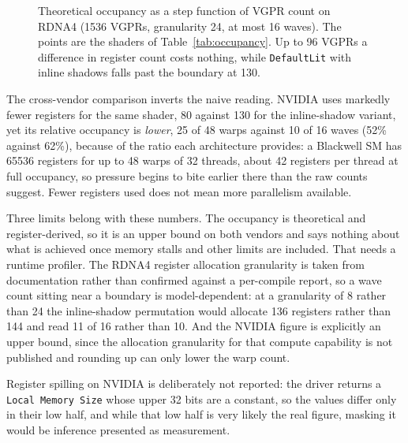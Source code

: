 \begin{figure}[tbp]
\centering
{}
\caption[Occupancy as a step function of VGPR count]{Theoretical occupancy as a step function of VGPR
count on RDNA4 (1536 VGPRs, granularity 24, at most 16 waves). The points are the shaders of
Table~\ref{tab:occupancy}. Up to 96 VGPRs a difference in register count costs nothing, while
\texttt{DefaultLit} with inline shadows falls past the boundary at 130.}
\label{fig:occupancy-cliff}
\end{figure}

The cross-vendor comparison inverts the naive reading. NVIDIA uses markedly fewer registers for the
same shader, 80 against 130 for the inline-shadow variant, yet its relative occupancy is \emph{lower},
25 of 48 warps against 10 of 16 waves (52\% against 62\%), because of the ratio each architecture
provides: a Blackwell SM has 65536 registers for up to 48 warps of 32 threads, about 42 registers per
thread at full occupancy, so pressure begins to bite earlier there than the raw counts suggest. Fewer
registers used does not mean more parallelism available.

Three limits belong with these numbers. The occupancy is theoretical and register-derived, so it is an
upper bound on both vendors and says nothing about what is achieved once memory stalls and other
limits are included. That needs a runtime profiler. The RDNA4 register allocation granularity is taken
from documentation rather than confirmed against a per-compile report,
so a wave count sitting near a boundary is model-dependent: at a granularity of 8 rather than 24
the inline-shadow permutation would allocate 136 registers rather than 144 and read 11 of 16 rather
than 10. And the NVIDIA figure is explicitly
an upper bound, since the allocation granularity for that compute capability is not published and
rounding up can only lower the warp count.

Register spilling on NVIDIA is deliberately not reported: the driver returns a \texttt{Local Memory
Size} whose upper 32 bits are a constant, so the values differ only in their low half, and while that
low half is very likely the real figure, masking it would be inference presented as measurement.
